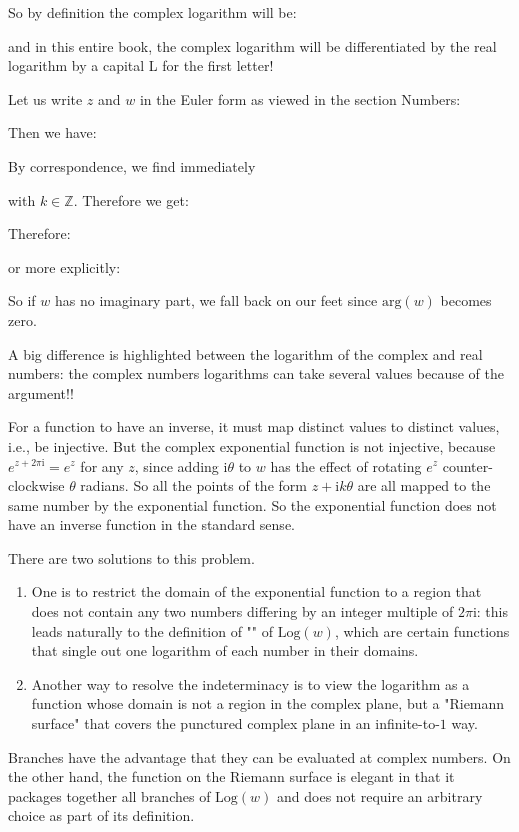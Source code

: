 	So by definition the complex logarithm will be:
	
	and in this entire book, the complex logarithm will be differentiated by the real logarithm by a capital L for the first letter!
	
	Let us write $z$ and $w$ in the Euler form as viewed in the section Numbers:
	
	Then we have:
	
	By correspondence, we find immediately
	
	with $k \in \mathbb{Z}$. Therefore we get:
	
	Therefore:
	
	or more explicitly:
	
	So if $w$ has no imaginary part, we fall back on our feet since $\text{arg} (w)$ becomes zero.
	
	A big difference is highlighted between the logarithm of the complex and real numbers: the complex numbers logarithms can take several values because of the argument!!
	
	For a function to have an inverse, it must map distinct values to distinct values, i.e., be injective. But the complex exponential function is not injective, because $e^{z+2\pi \mathrm{i} }= e^z$ for any $z$, since adding $\mathrm{i}\theta$ to $w$ has the effect of rotating $e^z$ counter-clockwise $\theta$ radians. So all the points of the form $z+\mathrm{i}k\theta$  are all mapped to the same number by the exponential function. So the exponential function does not have an inverse function in the standard sense.
	
	There are two solutions to this problem.
	
	\begin{enumerate}
		\item One is to restrict the domain of the exponential function to a region that does not contain any two numbers differing by an integer multiple of $2\pi \mathrm{i}$: this leads naturally to the definition of "" of $\text{Log}(w)$, which are certain functions that single out one logarithm of each number in their domains.
		
		\item Another way to resolve the indeterminacy is to view the logarithm as a function whose domain is not a region in the complex plane, but a "Riemann surface" that covers the punctured complex plane in an infinite-to-$1$ way.
	\end{enumerate}
	Branches have the advantage that they can be evaluated at complex numbers. On the other hand, the function on the Riemann surface is elegant in that it packages together all branches of $\text{Log}(w)$ and does not require an arbitrary choice as part of its definition.
	

